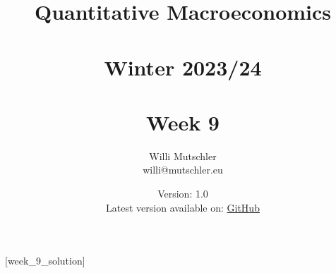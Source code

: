 
\newif\ifDisplaySolutions%


\title{Quantitative Macroeconomics\\~\\Winter 2023/24\\~\\Week 9}
\author{Willi Mutschler\\willi@mutschler.eu}
\date{Version: 1.0\\Latest version available on: \href{https://github.com/wmutschl/Quantitative-Macroeconomics/releases/latest/download/week_9.pdf}{GitHub}}
\maketitle\thispagestyle{empty}

\newpage
{}[week_9_solution]
\tableofcontents\thispagestyle{empty}\newpage

\setcounter{page}{1}
\newpage
\newpage
\newpage

\printbibliography
\newpage

\ifDisplaySolutions
\newpage
\appendix
\section{Solutions}

\fi
